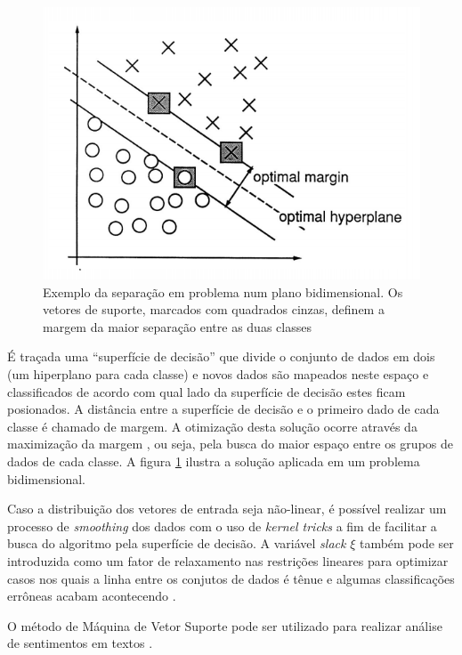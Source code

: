 \documentclass[
	12pt,				%
	openright,			%
	oneside,			%
	a4paper,			%
	english,			%
	spanish,			%
	brazil				%
	]{abntex2}
\begin{document}
	\begin{figure}[H]
\centering
\includegraphics[scale=0.5]{svm_distribution}
\caption{Exemplo da separação em problema num plano bidimensional. Os vetores de suporte, marcados com quadrados cinzas, definem a margem da maior separação entre as duas classes \cite{cortes}}
\label{svm}
\end{figure}
	
	É traçada uma ``superfície de decisão'' que divide o conjunto de dados em dois (um hiperplano para cada classe) e novos dados são mapeados neste espaço e classificados de acordo com qual lado da superfície de decisão estes ficam posionados. A distância entre a superfície de decisão e o primeiro dado de cada classe é chamado de margem. A otimização desta solução ocorre através da maximização da margem \cite{r_julian_heart}, ou seja, pela busca do maior espaço entre os grupos de dados de cada classe. \cite{r_julian_heart} A figura \ref{svm} ilustra a solução aplicada em um problema bidimensional.

	Caso a distribuição dos vetores de entrada seja não-linear, é possível realizar um processo de \emph{smoothing} dos dados com o uso de \emph{kernel tricks} a fim de facilitar a busca do algoritmo pela superfície de decisão. A variável \emph{slack} $\xi$ também pode ser introduzida como um fator de relaxamento nas restrições lineares para optimizar casos nos quais a linha entre os conjutos de dados é tênue e algumas classificações errôneas acabam acontecendo \cite{r_julian_heart}.
	
	O método de Máquina de Vetor Suporte pode ser utilizado para realizar análise de sentimentos em textos \cite{patil}.
	
\end{document}
